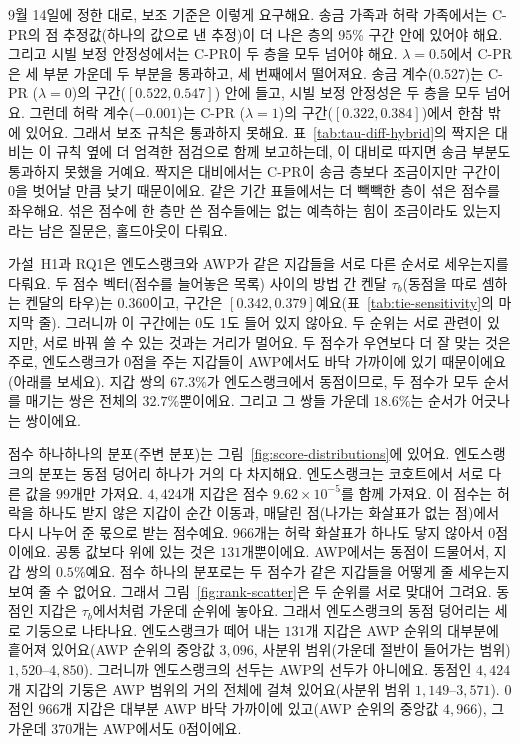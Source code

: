 9월 14일에 정한 대로, 보조 기준은 이렇게 요구해요. 송금 가족과 허락 가족에서는 C-PR의 점 추정값(하나의 값으로 낸 추정)이 더 나은 층의 95\% 구간 안에 있어야 해요. 그리고 시빌 보정 안정성에서는 C-PR이 두 층을 모두 넘어야 해요. $\lambda=0.5$에서 C-PR은 세 부분 가운데 두 부분을 통과하고, 세 번째에서 떨어져요. 송금 계수($0.527$)는 C-PR ($\lambda=0$)의 구간($[0.522,0.547]$) 안에 들고, 시빌 보정 안정성은 두 층을 모두 넘어요. 그런데 허락 계수($-0.001$)는 C-PR ($\lambda=1$)의 구간($[0.322,0.384]$)에서 한참 밖에 있어요. 그래서 보조 규칙은 통과하지 못해요. 표~\ref{tab:tau-diff-hybrid}의 짝지은 대비는 이 규칙 옆에 더 엄격한 점검으로 함께 보고하는데, 이 대비로 따지면 송금 부분도 통과하지 못했을 거예요. 짝지은 대비에서는 C-PR이 송금 층보다 조금이지만 구간이 0을 벗어날 만큼 낮기 때문이에요. 같은 기간 표들에서는 더 빽빽한 층이 섞은 점수를 좌우해요. 섞은 점수에 한 층만 쓴 점수들에는 없는 예측하는 힘이 조금이라도 있는지라는 남은 질문은, 홀드아웃이 다뤄요.


가설~H1과 RQ1은 엔도스랭크와 AWP가 같은 지갑들을 서로 다른 순서로 세우는지를 다뤄요. 두 점수 벡터(점수를 늘어놓은 목록) 사이의 방법 간 켄달 $\tau_b$(동점을 따로 셈하는 켄달의 타우)는 $0.360$이고, 구간은 $[0.342,0.379]$예요(표~\ref{tab:tie-sensitivity}의 마지막 줄). 그러니까 이 구간에는 0도 1도 들어 있지 않아요. 두 순위는 서로 관련이 있지만, 서로 바꿔 쓸 수 있는 것과는 거리가 멀어요. 두 점수가 우연보다 더 잘 맞는 것은 주로, 엔도스랭크가 0점을 주는 지갑들이 AWP에서도 바닥 가까이에 있기 때문이에요(아래를 보세요). 지갑 쌍의 $67.3\%$가 엔도스랭크에서 동점이므로, 두 점수가 모두 순서를 매기는 쌍은 전체의 $32.7\%$뿐이에요. 그리고 그 쌍들 가운데 $18.6\%$는 순서가 어긋나는 쌍이에요.

점수 하나하나의 분포(주변 분포)는 그림~\ref{fig:score-distributions}에 있어요. 엔도스랭크의 분포는 동점 덩어리 하나가 거의 다 차지해요. 엔도스랭크는 코호트에서 서로 다른 값을 $99$개만 가져요. $4{,}424$개 지갑은 점수 $9.62\times10^{-5}$를 함께 가져요. 이 점수는 허락을 하나도 받지 않은 지갑이 순간 이동과, 매달린 점(나가는 화살표가 없는 점)에서 다시 나누어 준 몫으로 받는 점수예요. $966$개는 허락 화살표가 하나도 닿지 않아서 0점이에요. 공통 값보다 위에 있는 것은 $131$개뿐이에요. AWP에서는 동점이 드물어서, 지갑 쌍의 $0.5\%$예요. 점수 하나의 분포로는 두 점수가 같은 지갑들을 어떻게 줄 세우는지 보여 줄 수 없어요. 그래서 그림~\ref{fig:rank-scatter}은 두 순위를 서로 맞대어 그려요. 동점인 지갑은 $\tau_b$에서처럼 가운데 순위에 놓아요. 그래서 엔도스랭크의 동점 덩어리는 세로 기둥으로 나타나요. 엔도스랭크가 떼어 내는 $131$개 지갑은 AWP 순위의 대부분에 흩어져 있어요(AWP 순위의 중앙값 $3{,}096$, 사분위 범위(가운데 절반이 들어가는 범위) $1{,}520$--$4{,}850$). 그러니까 엔도스랭크의 선두는 AWP의 선두가 아니에요. 동점인 $4{,}424$개 지갑의 기둥은 AWP 범위의 거의 전체에 걸쳐 있어요(사분위 범위 $1{,}149$--$3{,}571$). 0점인 $966$개 지갑은 대부분 AWP 바닥 가까이에 있고(AWP 순위의 중앙값 $4{,}966$), 그 가운데 $370$개는 AWP에서도 0점이에요.

